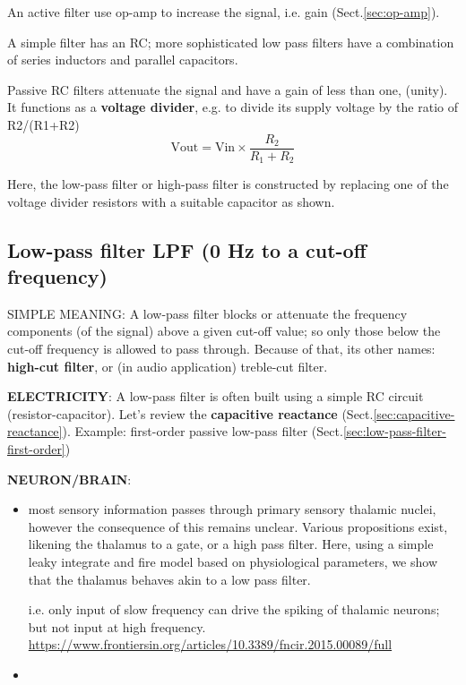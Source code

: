 An active filter use op-amp to increase the signal, i.e. gain
(Sect.\ref{sec:op-amp}).

A simple filter has an RC; more sophisticated low pass filters have a
combination of series inductors and parallel capacitors.


Passive RC filters attenuate the signal and have a gain of less than one,
(unity). It functions as a {\bf voltage divider}, e.g.
to divide its supply voltage by the ratio of R2/(R1+R2)
\begin{equation}
\text{Vout} = \text{Vin} \times \frac{R_2}{R_1 + R_2}
\end{equation}

Here, the low-pass filter or high-pass filter is constructed by replacing one of
the voltage divider resistors with a suitable capacitor as shown.


\subsection{Low-pass filter LPF (0 Hz to a cut-off frequency)}
\label{sec:low-pass-filter}

SIMPLE MEANING: A low-pass filter blocks or attenuate the frequency components
(of the signal) above a given cut-off value; so only those below the cut-off frequency is
allowed to pass through. Because of that, its other names: {\bf high-cut
filter}, or (in audio application) treble-cut filter.


{\bf ELECTRICITY}:  A low-pass filter is often built using a simple RC circuit
(resistor-capacitor). Let's review the {\bf capacitive reactance}
(Sect.\ref{sec:capacitive-reactance}). Example: first-order passive low-pass
filter (Sect.\ref{sec:low-pass-filter-first-order})

{\bf NEURON/BRAIN}: 
\begin{itemize}
  \item  most sensory information passes through primary sensory thalamic
  nuclei, however the consequence of this remains unclear. Various propositions
  exist, likening the thalamus to a gate, or a high pass filter. Here, using a
  simple leaky integrate and fire model based on physiological parameters, we
  show that the thalamus behaves akin to a low pass filter.

i.e. only input of slow frequency can drive the spiking of thalamic neurons; but
not input at high frequency.
\url{https://www.frontiersin.org/articles/10.3389/fncir.2015.00089/full}

  \item 
\end{itemize}


